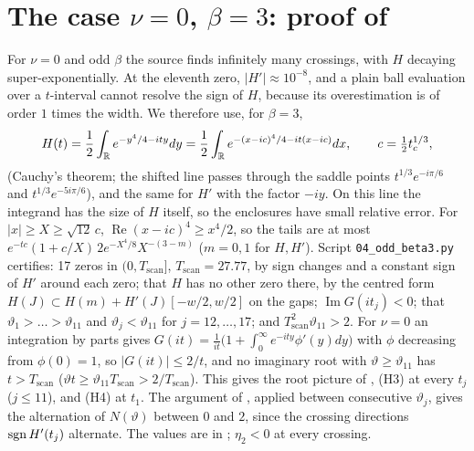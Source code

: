 \documentclass[11pt,a4paper]{report}
\newcommand{\vth}{\vartheta}
\begin{document}


\section{The case \texorpdfstring{$\nu=0$, $\beta=3$}{nu=0, beta=3}: proof of \texorpdfstring{}{Theorem D}}\label{sec:odd}

For $\nu=0$ and odd $\beta$ the source finds infinitely many crossings, with $H$ decaying super-exponentially. At the eleventh zero, $|H'|\approx10^{-8}$, and a plain ball evaluation over a $t$-interval cannot resolve the sign of $H$, because its overestimation is of order $1$ times the width. We therefore use, for $\beta=3$,
\[
H(t)=\frac12\int_{\mathbb{R}}e^{-y^4/4-ity}dy=\frac12\int_{\mathbb{R}}e^{-(x-ic)^4/4-it(x-ic)}dx,\qquad c=\tfrac12t_c^{1/3},
\]
(Cauchy's theorem; the shifted line passes through the saddle points $t^{1/3}e^{-i\pi/6}$ and $t^{1/3}e^{-5i\pi/6}$), and the same for $H'$ with the factor $-iy$. On this line the integrand has the size of $H$ itself, so the enclosures have small relative error. For $|x|\ge X\ge\sqrt{12}\,c$, $\operatorname{Re}(x-ic)^4\ge x^4/2$, so the tails are at most $e^{-tc}(1+c/X)\,2e^{-X^4/8}X^{-(3-m)}$ ($m=0,1$ for $H,H'$). Script \texttt{04\_odd\_beta3.py} certifies: 17 zeros in $(0,T_{\mathrm{scan}}]$, $T_{\mathrm{scan}}=27.77$, by sign changes and a constant sign of $H'$ around each zero; that $H$ has no other zero there, by the centred form $H(J)\subset H(m)+H'(J)[-w/2,w/2]$ on the gaps; $\operatorname{Im}G(it_j)<0$; that $\vth_1>\dots>\vth_{11}$ and $\vth_j<\vth_{11}$ for $j=12,\dots,17$; and $T_{\mathrm{scan}}^2\vth_{11}>2$. For $\nu=0$ an integration by parts gives $G(it)=\frac1{it}\bigl(1+\int_0^\infty e^{-ity}\phi'(y)dy\bigr)$ with $\phi$ decreasing from $\phi(0)=1$, so $|G(it)|\le2/t$, and no imaginary root with $\vth\ge\vth_{11}$ has $t>T_{\mathrm{scan}}$ ($\vth t\ge\vth_{11}T_{\mathrm{scan}}>2/T_{\mathrm{scan}}$). This gives the root picture of , (H3) at every $t_j$ ($j\le 11$), and (H4) at $t_1$. The argument of , applied between consecutive $\vth_j$, gives the alternation of $N(\vth)$ between $0$ and $2$, since the crossing directions $\operatorname{sgn} H'(t_j)$ alternate. The values are in ; $\eta_2<0$ at every crossing.
\end{document}
